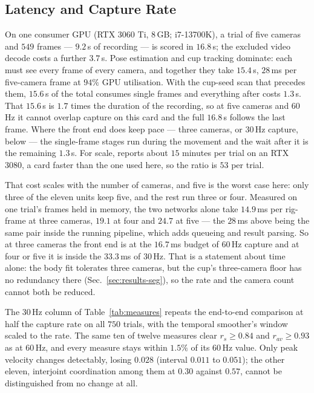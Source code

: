 \documentclass[conference]{IEEEtran}
\begin{document}
\subsection{Latency and Capture Rate}
\label{sec:results-latency}
On one consumer GPU (RTX 3060 Ti, 8\,GB; i7-13700K), a trial of five cameras and
$549$ frames --- $9.2$\,s of recording --- is scored in $16.8$\,s; the excluded video
decode costs a further $3.7$\,s. Pose estimation and cup tracking dominate: each must see every frame
of every camera, and together they take $15.4$\,s, $28$\,ms per five-camera
frame at $94\%$ GPU utilisation. With the cup-seed scan that precedes them,
$15.6$\,s of the total consumes single frames and everything after costs
$1.3$\,s. That $15.6$\,s is $1.7$ times the duration of the recording, so at five
cameras and $60$\,Hz it cannot overlap capture on this card and the full
$16.8$\,s follows the last frame. Where the front end does keep pace --- three
cameras, or $30$\,Hz capture, below --- the single-frame stages run during the
movement and the wait after it is the remaining $1.3$\,s. For scale, \cite{unger2024} reports about $15$ minutes per trial on an RTX
3080, a card faster than the one used here, so the ratio is $53$ per trial.

That cost scales with the number of cameras, and five is the worst case here:
only three of the eleven units keep five, and the rest run three or four.
Measured on one trial's frames held in memory, the two networks alone take
$14.9$\,ms per rig-frame at three cameras, $19.1$ at four and $24.7$ at five ---
the $28$\,ms above being the same pair inside the running pipeline, which adds
queueing and result parsing. So at three cameras the front end is at the
$16.7$\,ms budget of $60$\,Hz capture and at four or five it is inside the
$33.3$\,ms of $30$\,Hz. That is a statement about time alone: the body fit
tolerates three cameras, but the cup's three-camera floor has no redundancy there
(Sec.~\ref{sec:results-seg}), so the rate and the camera count cannot both be
reduced.

The $30$\,Hz column of Table~\ref{tab:measures} repeats the end-to-end comparison
at half the capture rate on all $750$ trials, with the temporal smoother's window
scaled to the rate. The same ten of twelve measures clear $r_s \ge 0.84$ and $r_{av} \ge 0.93$
as at $60$\,Hz, and every measure stays within $1.5\%$ of its $60$\,Hz value.
Only peak velocity changes detectably, losing $0.028$ (interval $0.011$ to
$0.051$); the other eleven, interjoint coordination among them at $0.30$ against
$0.57$, cannot be distinguished from no change at all.
\end{document}
